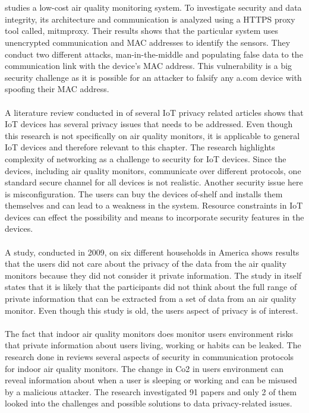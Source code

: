 \\\\
\cite{SecurityAndDataIntInAQM} studies a low-cost air quality monitoring system. To investigate security and data integrity, its architecture and communication is analyzed using a HTTPS proxy tool called, mitmproxy. Their results shows that the particular system uses unencrypted communication and MAC addresses to identify the sensors. They conduct two different attacks, man-in-the-middle and populating false data to the communication link with the device's MAC address. This vulnerability is a big security challenge as it is possible for an attacker to falsify any a.com device with spoofing their MAC address. \cite{SecurityAndDataIntInAQM}
\\\\
A literature review conducted in \cite{PrivacyOnGeneralIoT} of several IoT privacy related articles shows that IoT devices has several privacy issues that needs to be addressed. Even though this research is not specifically on air quality monitors, it is applicable to general IoT devices and therefore relevant to this chapter. The research highlights complexity of networking as a challenge to security for IoT devices. Since the devices, including air quality monitors, communicate over different protocols, one standard secure channel for all devices is not realistic. Another security issue here is misconfiguration. The users can buy the devices of-shelf and installs them themselves and can lead to a weakness in the system. Resource constraints in IoT devices can effect the possibility and means to incorporate security features in the devices. \cite{PrivacyOnGeneralIoT}
\\\\
A study, conducted in 2009, on six different households in America shows results that the users did not care about the privacy of the data from the air quality monitors because they did not consider it private information. \cite{inAirPrivacy} The study in itself states that it is likely that the participants did not think about the full range of private information that can be extracted from a set of data from an air quality monitor. Even though this study is old, the users aspect of privacy is of interest.
\\\\
The fact that indoor air quality monitors does monitor users environment risks that private information about users living, working or habits can be leaked. \cite{IAQMonitorCommunicationReview} The research done in \cite{IAQMonitorCommunicationReview} reviews several aspects of security in communication protocols for indoor air quality monitors. The change in Co2 in users environment can reveal information about when a user is sleeping or working and can be misused by a malicious attacker. The research investigated 91 papers and only 2 of them looked into the challenges and possible solutions to data privacy-related issues.  
